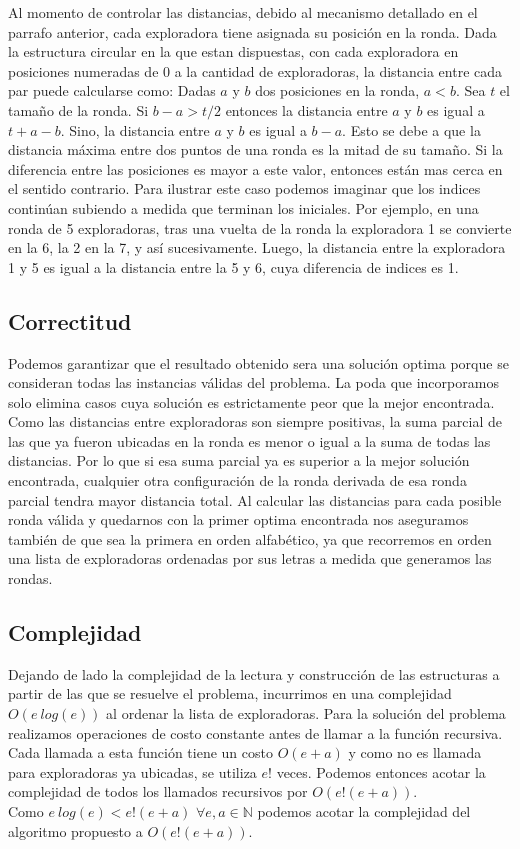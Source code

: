 Al momento de controlar las distancias, debido al mecanismo detallado en el parrafo anterior, cada exploradora tiene asignada su posición en la ronda. Dada la estructura circular en la que estan dispuestas, con cada exploradora en posiciones numeradas de 0 a la cantidad de exploradoras, la distancia entre cada par puede calcularse como:
 Dadas $a$ y $b$ dos posiciones en la ronda, $a < b$. Sea $t$ el tamaño de la ronda.
Si $b - a > t/2$ entonces la distancia entre $a$ y $b$ es igual a $t+ a - b$.
Sino, la distancia entre $a$ y $b$ es igual a $b - a$.
Esto se debe a que la distancia máxima entre dos puntos de una ronda es la mitad de su tamaño. Si la diferencia entre las posiciones es mayor a este valor, entonces están mas cerca en el sentido contrario. Para ilustrar este caso podemos imaginar que los indices continúan subiendo a medida que terminan los iniciales. Por ejemplo, en una ronda de 5 exploradoras, tras una vuelta de la ronda la exploradora 1 se convierte en la 6, la 2 en la 7, y así sucesivamente. Luego, la distancia entre la exploradora 1 y 5 es igual a la distancia entre la 5 y 6, cuya diferencia de indices es 1.


\subsection{Correctitud}

Podemos garantizar que el resultado obtenido sera una solución optima porque se consideran todas las instancias válidas del problema.
La poda que incorporamos solo elimina casos cuya solución es estrictamente peor que la mejor encontrada. 
Como las distancias entre exploradoras son siempre positivas, la suma parcial de las que ya fueron ubicadas en la ronda es menor o igual a la suma de todas las distancias. Por lo que si esa suma parcial ya es superior a la mejor solución encontrada, cualquier otra configuración de la ronda derivada de esa ronda parcial tendra mayor distancia total.
Al calcular las distancias para cada posible ronda válida y quedarnos con la primer optima encontrada nos aseguramos también de que sea la primera en orden alfabético, ya que recorremos en orden una lista de exploradoras ordenadas por sus letras a medida que generamos las rondas.

\subsection{Complejidad}

Dejando de lado la complejidad de la lectura y construcción de las estructuras a partir de las que se resuelve el problema, incurrimos en una complejidad 
$O(e \ log(e))$ al ordenar la lista de exploradoras.
Para la solución del problema realizamos operaciones de costo constante antes de llamar a la función recursiva. 
Cada llamada a esta función tiene un costo $O(e+a)$ y como no es llamada para exploradoras ya ubicadas, se utiliza $e!$ veces.
Podemos entonces acotar la complejidad de todos los llamados recursivos por $O(e! (e+a))$.\\
Como $e\ log(e) < e! (e+a) $ $\forall{e,a \in \mathbb{N}}$ podemos acotar la complejidad del algoritmo propuesto a $O(e! (e+a))$. 


